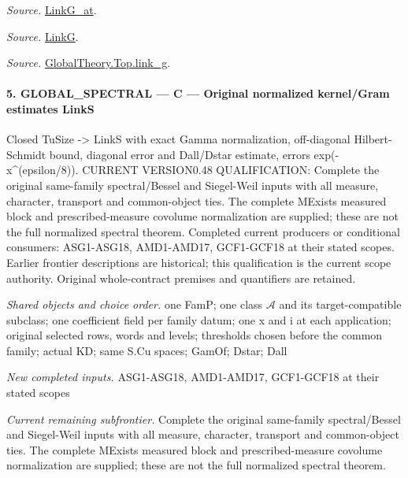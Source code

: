 \emph{Source.} \href{https://github.com/CocoSgt/riemann-hypothesis-lean/blob/7cbf7a0c32fca1badf05931879a37c3f8a2b03b4/src/Formalism/SharpRestriction/GlobalTheoremInputs.lean#L122-L137}{LinkG\_\allowbreak at}.

\emph{Source.} \href{https://github.com/CocoSgt/riemann-hypothesis-lean/blob/7cbf7a0c32fca1badf05931879a37c3f8a2b03b4/src/Formalism/SharpRestriction/GlobalTheoremInputs.lean#L138-L141}{LinkG}.

\emph{Source.} \href{https://github.com/CocoSgt/riemann-hypothesis-lean/blob/7cbf7a0c32fca1badf05931879a37c3f8a2b03b4/src/Development/AbelianVarietyTheory/Proofs/GlobalInterpolation/LinkG.lean#L14-L27}{GlobalTheory.Top.link\_\allowbreak g}.



\paragraph{5. GLOBAL\_\allowbreak SPECTRAL — C — Original normalized kernel/Gram estimates LinkS}

Closed TuSize -> LinkS with exact Gamma normalization, off-diagonal Hilbert-Schmidt bound, diagonal error and Dall/Dstar estimate, errors exp(-x\textasciicircum{}(epsilon/8)). CURRENT VERSION0.48 QUALIFICATION: Complete the original same-family spectral/Bessel and Siegel-Weil inputs with all measure, character, transport and common-object ties. The complete MExists measured block and prescribed-measure covolume normalization are supplied; these are not the full normalized spectral theorem. Completed current producers or conditional consumers: ASG1-ASG18, AMD1-AMD17, GCF1-GCF18 at their stated scopes. Earlier frontier descriptions are historical; this qualification is the current scope authority. Original whole-contract premises and quantifiers are retained.

\emph{Shared objects and choice order.} one FamP; one class $\mathcal A$ and its target-compatible subclass; one coefficient field per family datum; one x and i at each application; original selected rows, words and levels; thresholds chosen before the common family; actual KD; same S.Cu spaces; GamOf; Dstar; Dall

\emph{New completed inputs.} ASG1-ASG18, AMD1-AMD17, GCF1-GCF18 at their stated scopes

\emph{Current remaining subfrontier.} Complete the original same-family spectral/Bessel and Siegel-Weil inputs with all measure, character, transport and common-object ties. The complete MExists measured block and prescribed-measure covolume normalization are supplied; these are not the full normalized spectral theorem.

